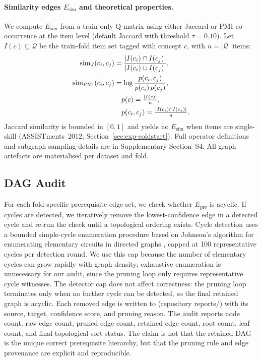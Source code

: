 \documentclass[preprint,10pt,doubleblind]{elsarticle}
\newcommand{\Epre}{\ensuremath{E_{\text{pre}}}}
\newcommand{\Esim}{\ensuremath{E_{\text{sim}}}}
\begin{document}
\paragraph{Similarity edges $\Esim$ and theoretical properties.}
\label{sec:graph-sim-theory}
We compute $\Esim$ from a train-only Q-matrix using either Jaccard or
PMI co-occurrence at the item level (default Jaccard with threshold
$\tau{=}0.10$). Let $I(c)\subseteq\mathcal{Q}$ be the train-fold item
set tagged with concept $c$, with $n=|\mathcal{Q}|$ items:
\begin{align}
\mathrm{sim}_J(c_i,c_j) &=
  \frac{|I(c_i)\cap I(c_j)|}{|I(c_i)\cup I(c_j)|},
  \label{eq:sim-jaccard}\\
\mathrm{sim}_{\mathrm{PMI}}(c_i,c_j) &=
  \log \frac{p(c_i,c_j)}{p(c_i)\,p(c_j)},
  \label{eq:sim-pmi}\notag\\
&\quad p(c)=\tfrac{|I(c)|}{n},\notag\\
&\quad p(c_i,c_j)=\tfrac{|I(c_i)\cap I(c_j)|}{n}.
\end{align}
Jaccard similarity is bounded in $[0,1]$ and yields no $\Esim$ when items are
single-skill (ASSISTments~2012; Section~\ref{sec:exp-coldstart}). Full
operator definitions and subgraph sampling details are in Supplementary
Section~S4. All graph artefacts are materialised per dataset and fold.
\subsection{DAG Audit}
\label{sec:dag-audit}
For each fold-specific prerequisite edge set, we check whether $\Epre$
is acyclic. If cycles are detected, we iteratively remove the
lowest-confidence edge in a detected cycle and re-run the check until a
topological ordering exists. Cycle detection uses a bounded simple-cycle enumeration procedure based on
Johnson's algorithm for enumerating elementary circuits in directed graphs \cite{johnson1975finding}, capped at 100 representative cycles per detection round. We use this cap because the number of elementary cycles can grow rapidly with graph density; exhaustive enumeration is unnecessary for our
audit, since the pruning loop only requires representative cycle witnesses. The detector cap does not affect
correctness: the pruning loop terminates only when no further cycle can
be detected, so the final retained graph is acyclic. Each removed edge
is written to
 (repository reports/) with its source,
target, confidence score, and pruning reason. The audit reports node
count, raw edge count, pruned edge count, retained edge count, root
count, leaf count, and final topological-sort status. The claim is not
that the retained DAG is the unique correct prerequisite hierarchy, but
that the pruning rule and edge provenance are explicit and reproducible.
\end{document}
